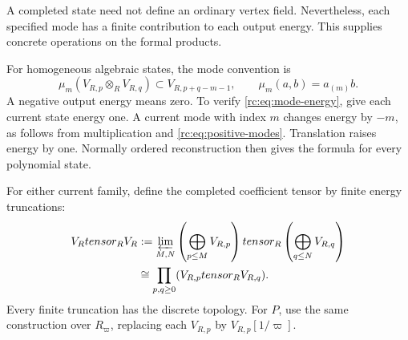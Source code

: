 A completed state need not define an ordinary vertex field.
Nevertheless, each specified mode has a finite contribution
to each output energy.  This supplies concrete operations on
the formal products.

For homogeneous algebraic states, the mode convention is
\begin{equation}\label{rc:eq:mode-energy}
 \mu_m(V_{R,p}\otimes_RV_{R,q})
       \subset V_{R,p+q-m-1},\qquad
 \mu_m(a,b)=a_{(m)}b.
\end{equation}
A negative output energy means zero.
To verify \eqref{rc:eq:mode-energy}, give each current state
energy one.  A current mode with index \(m\) changes energy
by \(-m\), as follows from multiplication and
\eqref{rc:eq:positive-modes}.  Translation raises energy by
one.  Normally ordered reconstruction then gives the formula
for every polynomial state.

For either current family, define the completed coefficient tensor
by finite energy truncations:
\begin{equation}\label{rc:eq:completed-tensor}
\begin{split}
 \widehat V_R\widehat\otimes_R\widehat V_R
 &:=
 \varprojlim_{M,N}
 \left(\bigoplus_{p\leq M}V_{R,p}\right)
 \otimes_R
 \left(\bigoplus_{q\leq N}V_{R,q}\right)\\
 &\cong\prod_{p,q\geq0}(V_{R,p}\otimes_RV_{R,q}).
\end{split}
\end{equation}
Every finite truncation has the discrete topology.
For \(P\), use the same construction over \(R_\varpi\),
replacing each \(V_{R,p}\) by \(V_{R,p}[1/\varpi]\).

